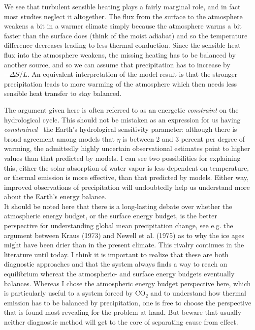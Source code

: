\documentclass[12pt]{book}
\begin{document}
We see that turbulent sensible heating plays a fairly marginal role, and in fact most studies neglect it altogether. The flux from the surface to the atmosphere weakens a bit in a warmer climate simply because the atmosphere warms a bit faster than the surface does (think of the moist adiabat) and so the temperature difference decreases leading to less thermal conduction. Since the sensible heat flux into the atmosphere weakens, the missing heating has to be balanced by another source, and so we can assume that precipitation has to increase by $-\Delta S/L$. An equivalent interpretation of the model result is that the stronger precipitation leads to more warming of the atmosphere which then needs less sensible heat transfer to stay balanced. 

The argument given here is often referred to as an energetic {\em constraint} on the hydrological cycle. This should not be mistaken as an expression for us having {\em constrained } the Earth's hydrological sensitivity parameter: although there is broad agreement among models that $\eta$ is between 2 and 3 percent per degree of warming, the admittedly highly uncertain observational estimates point to higher values than that predicted by models. I can see two possibilities for explaining this, either the solar absorption of water vapor is less dependent on temperature, or thermal emission is more effective, than that predicted by models. Either way, improved observations of precipitation will undoubtedly help us understand more about the Earth's energy balance.
\\

\noindent It should be noted here that there is a long-lasting debate over whether the atmospheric energy budget, or the surface energy budget, is the better perspective for understanding global mean precipitation change, see e.g. the argument between Kraus (1973) and Newell et al. (1975) as to why the ice ages might have been drier than in the present climate. This rivalry continues in the literature until today. I think it is important to realize that these are both diagnostic approaches and that the system always finds a way to reach an equilibrium whereat the atmospheric- and surface energy budgets eventually balances. Whereas I chose the atmospheric energy budget perspective here, which is particularly useful to a system forced by CO$_2$ and to understand how thermal emission has to be balanced by precipitation, one is free to choose the perspective that is found most revealing for the problem at hand. But beware that usually neither diagnostic method will get to the core of separating cause from effect. 
\end{document}

